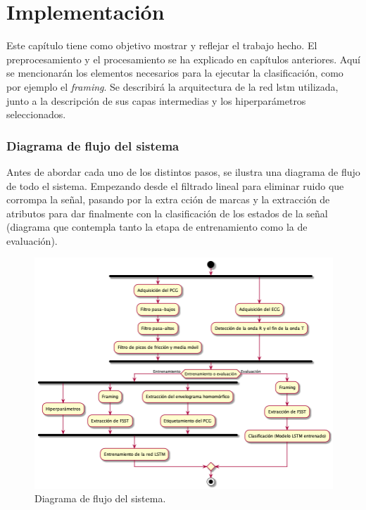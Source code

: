 \usepackage{amsfonts}

\chapter{Implementación} \label{ch:results}

\indent Este capítulo tiene como objetivo mostrar y reflejar el trabajo hecho. El preprocesamiento y el
procesamiento se ha explicado en capítulos anteriores. Aquí se mencionarán los elementos necesarios para la ejecutar
la clasificación, como por ejemplo el \textit{framing}. Se describirá la arquitectura de la red \acrshort{lstm}
utilizada, junto a la descripción de sus capas intermedias y los hiperparámetros seleccionados. \bigskip

\subsection*{Diagrama de flujo del sistema} \label{subsec:flow-diagram}

\indent Antes de abordar cada uno de los distintos pasos, se ilustra una diagrama de flujo de todo el sistema.
Empezando desde el filtrado lineal para eliminar ruido que corrompa la señal, pasando por la extra cción de marcas y
la extracción de atributos para dar finalmente con la clasificación de los estados de la señal (diagrama que
contempla tanto la etapa de entrenamiento como la de evaluación).


\begin{figure}[H]
  \centering
  \includegraphics[scale=0.5]{sections/chapter-07/images/flow-diagram.png}
  \caption[Diagrama de flujo del sistema]{Diagrama de flujo del sistema.}
  \label{fig:flow-diagram}
\end{figure}

